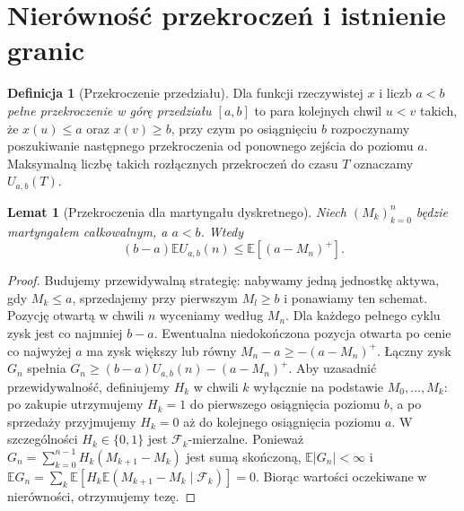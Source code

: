 \documentclass[11pt,a4paper,oneside]{report}
\numberwithin{equation}{chapter}
\theoremstyle{plain}
\newtheorem{lemat}[twierdzenie]{Lemat}
\theoremstyle{definition}
\newtheorem{definicja}{Definicja}[chapter]
\theoremstyle{remark}
\newcommand{\E}{\mathbb{E}}
\newcommand{\calF}{\mathcal{F}}
\begin{document}
\section{Nierówność przekroczeń i istnienie granic}
\begin{definicja}[Przekroczenie przedziału]
Dla funkcji rzeczywistej $x$ i liczb $a<b$\emph{
pełne przekroczenie w górę przedziału $[a,b]$} to
para kolejnych chwil $u<v$ takich, że $x(u)\le a$
oraz $x(v)\ge b$, przy czym po osiągnięciu $b$
rozpoczynamy poszukiwanie następnego przekroczenia
od ponownego zejścia do poziomu $a$. Maksymalną liczbę
takich rozłącznych przekroczeń do czasu $T$ oznaczamy
$U_{a,b}(T)$.
\end{definicja}

\begin{lemat}[Przekroczenia dla martyngału dyskretnego]
Niech $(M_k)_{k=0}^n$ będzie martyngałem całkowalnym,
a $a<b$. Wtedy
\[
(b-a)\E U_{a,b}(n)\le\E[(a-M_n)^+].
\]
\end{lemat}
\begin{proof}
Budujemy przewidywalną strategię: nabywamy jedną jednostkę
aktywa, gdy $M_k\le a$, sprzedajemy przy pierwszym
$M_l\ge b$ i ponawiamy ten schemat. Pozycję otwartą
w chwili $n$ wyceniamy według $M_n$.
Dla każdego pełnego cyklu zysk jest co najmniej $b-a$.
Ewentualna niedokończona pozycja otwarta po cenie
co najwyżej $a$ ma zysk większy lub równy
$M_n-a\ge-(a-M_n)^+$. Łączny zysk $G_n$ spełnia
$G_n\ge(b-a)U_{a,b}(n)-(a-M_n)^+$.
Aby uzasadnić przewidywalność, definiujemy $H_k$ w chwili $k$
wyłącznie na podstawie $M_0,\ldots,M_k$: po zakupie utrzymujemy
$H_k=1$ do pierwszego osiągnięcia poziomu $b$, a po sprzedaży
przyjmujemy $H_k=0$ aż do kolejnego osiągnięcia poziomu $a$.
W szczególności $H_k\in\{0,1\}$ jest $\calF_k$-mierzalne.
Ponieważ
$G_n=\sum_{k=0}^{n-1}H_k(M_{k+1}-M_k)$ jest sumą skończoną,
$\E|G_n|<\infty$ i
$\E G_n=\sum_k\E[H_k\E(M_{k+1}-M_k\mid\calF_k)]=0$. Biorąc wartości
oczekiwane w nierówności, otrzymujemy tezę.
\end{proof}
\end{document}
